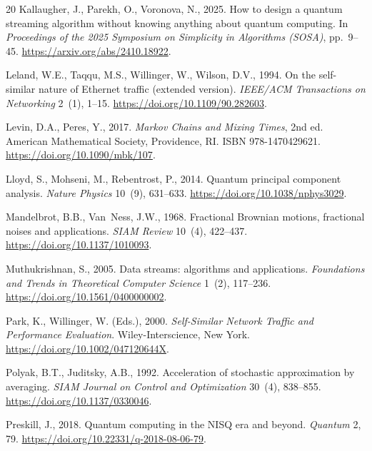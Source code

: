 \documentclass[preprint,12pt,authoryear]{elsarticle}
\begin{document}
\begin{thebibliography}{20}
Kallaugher, J., Parekh, O., Voronova, N., 2025.
\newblock How to design a quantum streaming algorithm without knowing anything about quantum computing.
\newblock In \emph{Proceedings of the 2025 Symposium on Simplicity in Algorithms (SOSA)}, pp.~9--45.
\newblock \url{https://arxiv.org/abs/2410.18922}.

Leland, W.E., Taqqu, M.S., Willinger, W., Wilson, D.V., 1994.
\newblock On the self-similar nature of Ethernet traffic (extended version).
\newblock \emph{IEEE/ACM Transactions on Networking} 2~(1), 1--15.
\newblock \url{https://doi.org/10.1109/90.282603}.

Levin, D.A., Peres, Y., 2017.
\newblock \emph{Markov Chains and Mixing Times}, 2nd ed.
\newblock American Mathematical Society, Providence, RI. ISBN 978-1470429621.
\newblock \url{https://doi.org/10.1090/mbk/107}.

Lloyd, S., Mohseni, M., Rebentrost, P., 2014.
\newblock Quantum principal component analysis.
\newblock \emph{Nature Physics} 10~(9), 631--633.
\newblock \url{https://doi.org/10.1038/nphys3029}.

Mandelbrot, B.B., Van~Ness, J.W., 1968.
\newblock Fractional Brownian motions, fractional noises and applications.
\newblock \emph{SIAM Review} 10~(4), 422--437.
\newblock \url{https://doi.org/10.1137/1010093}.

Muthukrishnan, S., 2005.
\newblock Data streams: algorithms and applications.
\newblock \emph{Foundations and Trends in Theoretical Computer Science} 1~(2), 117--236.
\newblock \url{https://doi.org/10.1561/0400000002}.

Park, K., Willinger, W. (Eds.), 2000.
\newblock \emph{Self-Similar Network Traffic and Performance Evaluation}.
\newblock Wiley-Interscience, New York.
\newblock \url{https://doi.org/10.1002/047120644X}.

Polyak, B.T., Juditsky, A.B., 1992.
\newblock Acceleration of stochastic approximation by averaging.
\newblock \emph{SIAM Journal on Control and Optimization} 30~(4), 838--855.
\newblock \url{https://doi.org/10.1137/0330046}.

Preskill, J., 2018.
\newblock Quantum computing in the NISQ era and beyond.
\newblock \emph{Quantum} 2, 79.
\newblock \url{https://doi.org/10.22331/q-2018-08-06-79}.


\end{thebibliography}
\end{document}
